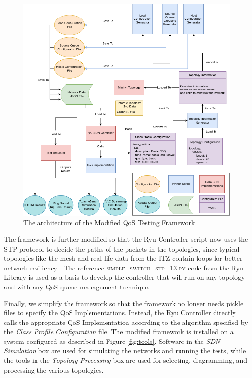 \begin{figure}[htbp!]
    \centering
    \includegraphics[width=\textwidth]{Figures/Test Framework Architecture.drawio.png}
    \caption{The architecture of the Modified QoS Testing Framework}
    \label{fig:new_architecture}
\end{figure}

The framework is further modified so that the Ryu Controller script now uses the STP protocol to decide the paths of the packets in the topologies, since typical topologies like the mesh and real-life data from the ITZ contain loops for better network resiliency \cite{smith_shortest_2011}. The reference \textsc{simple\_switch\_stp\_13.py} code from the Ryu Library is used as a basis to develop the controller that will run on any topology and with any QoS queue management technique.

Finally, we simplify the framework so that the framework no longer needs pickle files to specify the QoS Implementations. Instead, the Ryu Controller directly calls the appropriate QoS Implementation according to the algorithm specified by the \textit{Class Profile Configuration} file. The modified framework is installed on a system configured as described in Figure \ref{fig:tools}. Software in the \textit{SDN Simulation} box are used for simulating the networks and running the tests, while the tools in the \textit{Topology Processing} box are used for selecting, diagramming, and processing the various topologies.

